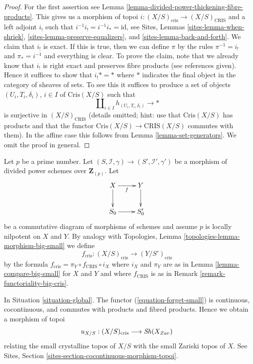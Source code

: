 \begin{proof}
For the first assertion see
Lemma \ref{lemma-divided-power-thickening-fibre-products}.
This gives us a morphism of topoi
$i : (X/S)_{\text{cris}} \to (X/S)_{\text{CRIS}}$ and a left adjoint
$i_!$ such that $i^{-1}i_! = i^{-1}i_* = \text{id}$, see
Sites, Lemmas \ref{sites-lemma-when-shriek},
\ref{sites-lemma-preserve-equalizers}, and
\ref{sites-lemma-back-and-forth}.
We claim that $i_!$ is exact. If this is true, then we can define
$\pi$ by the rules $\pi^{-1} = i_!$ and $\pi_* = i^{-1}$
and everything is clear. To prove the claim, note that we already know
that $i_!$ is right exact and preserves fibre products (see references
given). Hence it suffices to show that $i_! * = *$ where $*$ indicates
the final object in the category of sheaves of sets. 
To see this it suffices to produce a set of objects
$(U_i, T_i, \delta_i)$, $i \in I$ of $\text{Cris}(X/S)$ such that
$$
\coprod\nolimits_{i \in I} h_{(U_i, T_i, \delta_i)} \to *
$$
is surjective in $(X/S)_{\text{CRIS}}$ (details omitted; hint: use that
$\text{Cris}(X/S)$ has products and that the functor
$\text{Cris}(X/S) \to \text{CRIS}(X/S)$ commutes with them).
In the affine case this
follows from Lemma \ref{lemma-set-generators}. We omit the proof
in general.
\end{proof}

\begin{remark}[Functoriality]
\label{remark-functoriality-cris}
Let $p$ be a prime number.
Let $(S, \mathcal{I}, \gamma) \to (S', \mathcal{I}', \gamma')$
be a morphism of divided power schemes over $\mathbf{Z}_{(p)}$.
Let
$$
\xymatrix{
X \ar[r]_f \ar[d] & Y \ar[d] \\
S_0 \ar[r] & S'_0
}
$$
be a commutative diagram of morphisms of schemes and assume $p$ is
locally nilpotent on $X$ and $Y$. By analogy with
Topologies, Lemma \ref{topologies-lemma-morphism-big-small} we define
$$
f_{\text{cris}} : (X/S)_{\text{cris}} \longrightarrow (Y/S')_{\text{cris}}
$$
by the formula $f_{\text{cris}} = \pi_Y \circ f_{\text{CRIS}} \circ i_X$
where $i_X$ and $\pi_Y$ are as in Lemma \ref{lemma-compare-big-small}
for $X$ and $Y$ and where $f_{\text{CRIS}}$ is as in
Remark \ref{remark-functoriality-big-cris}.
\end{remark}

\begin{remark}
\label{remark-compare-zariski}
In Situation \ref{situation-global}.
The functor (\ref{equation-forget-small}) is continuous, cocontinuous, and
commutes with products and fibred products.
Hence we obtain a morphism of topoi
$$
u_{X/S} : (X/S)_{\text{cris}} \longrightarrow \mathop{\mathit{Sh}}\nolimits(X_{Zar})
$$
relating the small crystalline topos of $X/S$ with
the small Zariski topos of $X$.
See Sites, Section \ref{sites-section-cocontinuous-morphism-topoi}.
\end{remark}

